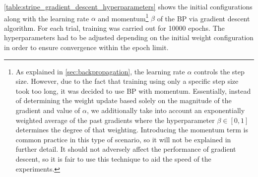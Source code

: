 \ref{table:stripe_gradient_descent_hyperparameters} shows the initial configurations along with the learning rate $\alpha$ and momentum\footnote{
    As explained in \ref{sec:backpropagation}, the learning rate $\alpha$ controls the step size.
    However, due to the fact that training using only a specific step size took too long, it was decided to use BP with momentum.
    Essentially, instead of determining the weight update based solely on the magnitude of the gradient and value of $\alpha$, we additionally take into account an exponentially weighted average of the past gradients where the hyperparameter $\beta\in[0,1]$ determines the degree of that weighting.
    Introducing the momentum term is common practice in this type of scenario, so it will not be explained in further detail.
    It should not adversely affect the performance of gradient descent, so it is fair to use this technique to aid the speed of the experiments.
}
$\beta$ of the BP via gradient descent algorithm.
For each trial, training was carried out for 10000 epochs. 
The hyperparameters had to be adjusted depending on the initial weight configuration in order to ensure convergence within the epoch limit.

